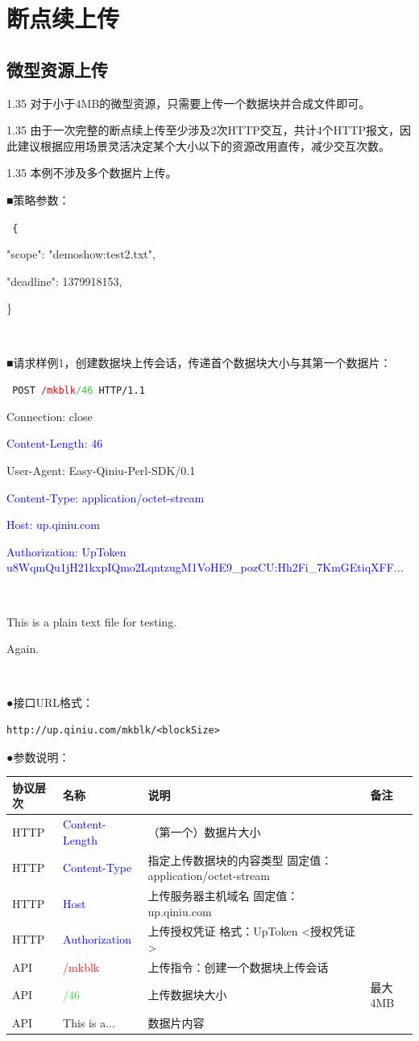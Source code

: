 \documentclass[11pt, oneside]{book}
\newcommand{\qpara}[1]{
\vspace{0.2em}
\begin{spacing}{1.35}
\noindent
#1\par
\end{spacing}
\vspace{0.2em}
}
\newcommand{\qblock}[1]{
\vspace{0.1em}
\noindent
#1\par
\vspace{0.1em}
}
\newcommand{\qtable}[1]{\footnotesize\vspace{0.5em}#1\vspace{0.5em}\normalsize}
\newcommand{\qhttp}[1]{\noindent #1\par}
\begin{document}
\section{断点续上传}

\subsection{微型资源上传}

\qpara{对于小于4MB的微型资源，只需要上传一个数据块并合成文件即可。}
\qpara{由于一次完整的断点续上传至少涉及2次HTTP交互，共计4个HTTP报文，因此建议根据应用场景灵活决定某个大小以下的资源改用直传，减少交互次数。}
\qpara{本例不涉及多个数据片上传。}

\qblock{■\thinspace 策略参数：}
{
\tt \footnotesize
\qhttp{\{}
\qhttp{    "scope":    "demoshow:test2.txt",}
\qhttp{    "deadline": 1379918153,}
\qhttp{\}}
\qhttp{\ }
}

\qblock{■\thinspace 请求样例1，创建数据块上传会话，传递首个数据块大小与其第一个数据片：}
{
\tt \footnotesize
\qhttp{POST \textcolor{red}{/mkblk}\textcolor{LimeGreen}{/46} HTTP/1.1}
\qhttp{Connection: close}
\qhttp{\textcolor{blue}{Content-Length: 46}}
\qhttp{User-Agent: Easy-Qiniu-Perl-SDK/0.1}
\qhttp{\textcolor{blue}{Content-Type: application/octet-stream}}
\qhttp{\textcolor{blue}{Host: up.qiniu.com}}
\qhttp{\textcolor{blue}{Authorization: UpToken u8WqmQu1jH21kxpIQmo2LqntzugM1VoHE9\_pozCU:Hh2Fi\_7KmGEtiqXFF...}}
\qhttp{\ }
\qhttp{\textcolor{YellowOrange}{This is a plain text file for testing.}}
\qhttp{\textcolor{YellowOrange}{Again.}}
\qhttp{\ }
}

\qblock{●\thinspace 接口URL格式：}
\begin{lstlisting}
http://up.qiniu.com/mkblk/<blockSize>
\end{lstlisting}

\qblock{●\thinspace 参数说明：}
\qtable{
\def\arraystretch{2}
\begin{tabular}{|l|p{9em}|p{17em}|p{7em}|}
\hline
协议层次 & 名称 & 说明 & 备注 \\
\hline
HTTP & \textcolor{blue}{Content-Length} & （第一个）数据片大小 & \\
\hline
HTTP & \textcolor{blue}{Content-Type} & 指定上传数据块的内容类型 \newline 固定值：application/octet-stream & \\
\hline
HTTP & \textcolor{blue}{Host} & 上传服务器主机域名 \newline 固定值：up.qiniu.com & \\
\hline
HTTP & \textcolor{blue}{Authorization} & 上传授权凭证 \newline 格式：UpToken <授权凭证> & \\
\hline
API & \textcolor{red}{/mkblk} & 上传指令：创建一个数据块上传会话 & \\
\hline
API & \textcolor{LimeGreen}{/46} & 上传数据块大小 & 最大4MB \\
\hline
API & \textcolor{YellowOrange}{This is a...} & 数据片内容 & \\
\hline
\end{tabular}
}
\end{document}
